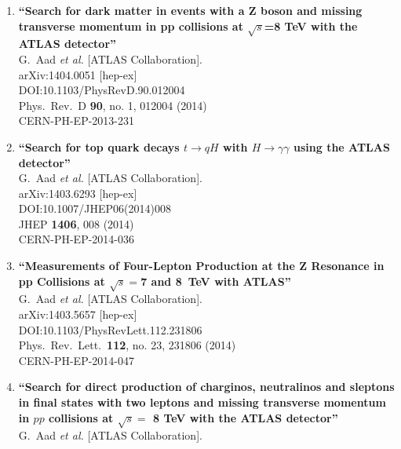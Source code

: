 \documentclass{article}
\begin{document}
\begin{enumerate}
\item%
{\bf ``Search for dark matter in events with a Z boson and missing transverse momentum in pp collisions at $\sqrt{s}$=8 TeV with the ATLAS detector''}
  \\{}G.~Aad {\it et al.} [ATLAS Collaboration].
  \\{}arXiv:1404.0051 [hep-ex]
  \\{}DOI:10.1103/PhysRevD.90.012004
  \\{}Phys.\ Rev.\ D {\bf 90}, no. 1, 012004 (2014)
  \\{}CERN-PH-EP-2013-231
\item%
{\bf ``Search for top quark decays $t \to qH$ with $H \to \gamma\gamma$ using the ATLAS detector''}
  \\{}G.~Aad {\it et al.} [ATLAS Collaboration].
  \\{}arXiv:1403.6293 [hep-ex]
  \\{}DOI:10.1007/JHEP06(2014)008
  \\{}JHEP {\bf 1406}, 008 (2014)
  \\{}CERN-PH-EP-2014-036
\item%
{\bf ``Measurements of Four-Lepton Production at the Z Resonance in pp Collisions at $\sqrt s=$7 and 8 TeV with ATLAS''}
  \\{}G.~Aad {\it et al.} [ATLAS Collaboration].
  \\{}arXiv:1403.5657 [hep-ex]
  \\{}DOI:10.1103/PhysRevLett.112.231806
  \\{}Phys.\ Rev.\ Lett.\  {\bf 112}, no. 23, 231806 (2014)
  \\{}CERN-PH-EP-2014-047
\item%
{\bf ``Search for direct production of charginos, neutralinos and sleptons in final states with two leptons and missing transverse momentum in $pp$ collisions at $\sqrt{s} =$ 8 TeV with the ATLAS detector''}
  \\{}G.~Aad {\it et al.} [ATLAS Collaboration].

\end{enumerate}
\end{document}
